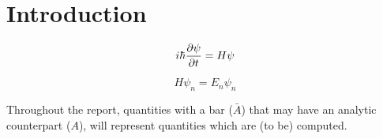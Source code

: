 \section{Introduction}

\begin{equation}\label{eq:SE}
i\hbar\pdv{\psi}{t} = H\psi
\end{equation}

\begin{equation} 
\label{eq:TISE}
H\psi_n = E_n\psi_n 
\end{equation}

Throughout the report, quantities with a bar ($\bar A$) that may have an analytic counterpart ($A$),  will represent quantities which are (to be) computed.